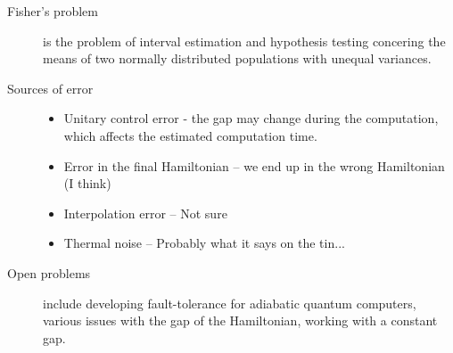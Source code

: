 \begin{description}
\item[Fisher's problem] is the problem of interval estimation and hypothesis testing concering the means of two normally distributed populations with unequal variances. 

\item[Sources of error] 
\begin{itemize}
\item Unitary control error - the gap may change during the computation, which affects the estimated computation time. 
\item Error in the final Hamiltonian -- we end up in the wrong Hamiltonian (I think)
\item Interpolation error -- Not sure
\item Thermal noise -- Probably what it says on the tin... 
\end{itemize}

\item[Open problems] include developing fault-tolerance for adiabatic quantum computers, various issues with the gap of the Hamiltonian, working with a constant gap. 

\end{description}

